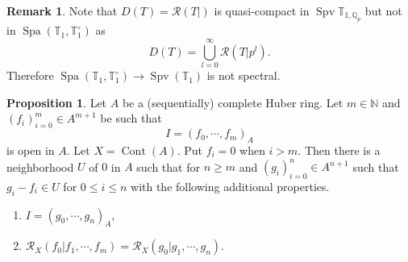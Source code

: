 \documentclass[10pt]{article}
\numberwithin{equation}{section}
\theoremstyle{definition}
\newtheorem{proposition}{Proposition}[subsection]
\newtheorem{remark}{Remark}[subsection]
\DeclareMathOperator{\Spa}{Spa}
\DeclareMathOperator{\Spv}{Spv}
\DeclareMathOperator{\Cont}{Cont}
\newcommand{\N}[0]{\mathbb{N}}
\newcommand{\Q}[0]{\mathbb{Q}}
\newcommand{\T}[0]{\mathbb{T}}
\newcommand{\cR}[0]{\mathcal{R}}
\begin{document}
\begin{remark}
    \label{remark_18_5}
    Note that $D(T) = \cR(T|)$ is quasi-compact in $\Spv\T_{1,\Q_p}$ but not in $\Spa(\T_1,\T_1^\circ)$ as
    \begin{equation*}
        D(T) = \bigcup_{l=0}^\infty \cR(T|p^l).
    \end{equation*}
    Therefore $\Spa(\T_1,\T_1^\circ)\to \Spv(\T_1)$ is not spectral.
\end{remark}
\begin{proposition}
    \label{proposition_18_3}
    Let $A$ be a (sequentially) complete Huber ring.
    Let $m\in \N$ and $(f_i)_{i=0}^m\in A^{m+1}$ be such that
    \begin{equation*}
        I=(f_0,\cdots,f_m)_A
    \end{equation*}
    is open in $A$. Let $X=\Cont(A)$. Put $f_i=0$ when $i>m$. Then there is a neighborhood $U$ of $0$ in $A$ such that for $n\geq m$ and $(g_i)_{i=0}^n\in A^{n+1}$ such that $g_i-f_i\in U$ for $0\leq i\leq n$ with the following additional properties.
    \begin{enumerate}[1.]
        \item $I=( g_0,\cdots,g_n)_A$,
        \item $\cR_X(f_0|f_1,\cdots,f_m)=\cR_X(g_0|g_1,\cdots,g_n)$.
    \end{enumerate}
\end{proposition}
\end{document}
